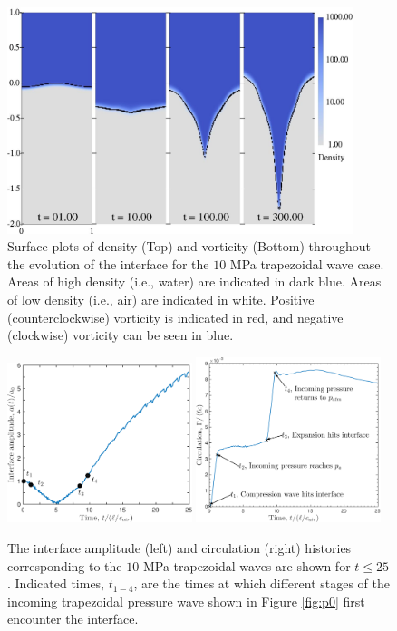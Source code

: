 \begin{figure}[h] 
  \centering
\includegraphics[width=0.9\textwidth]{./figs/lung_figs/snapshots_density_t1}
\caption[The evolution of the acoustically perturbed interface and vorticity field]{Surface plots of density (Top) and vorticity (Bottom)
  throughout the evolution of the interface for the $10$ MPa
  trapezoidal wave case. Areas of high density (i.e., water) are
indicated in dark blue. Areas of low density (i.e., air) are indicated
in white.  Positive (counterclockwise) vorticity is indicated in red,
and negative (clockwise) vorticity can be seen in blue.}
  \label{fig:interface_snapshots}
\end{figure}
%
\begin{figure}[h] 
  \centering
  \includegraphics[width=0.48\textwidth]{./figs/lung_figs/trapz10_intf_schematic}
  \includegraphics[width=0.48\textwidth]{./figs/lung_figs/trapz10_circ_schematic}
  \caption[The interface amplitude and circulation histories for the $10$ MPa trapezoidal wave]{The interface amplitude (left) and circulation (right)
    histories corresponding to the $10$ MPa trapezoidal waves are
    shown for $t\leq25$. Indicated times, $t_{1-4}$, are the times at
    which different stages of the incoming trapezoidal pressure wave
    shown in Figure \ref{fig:p0} first encounter the interface.}
  \label{fig:trapz10_circ_interface}
\end{figure}
%
%
